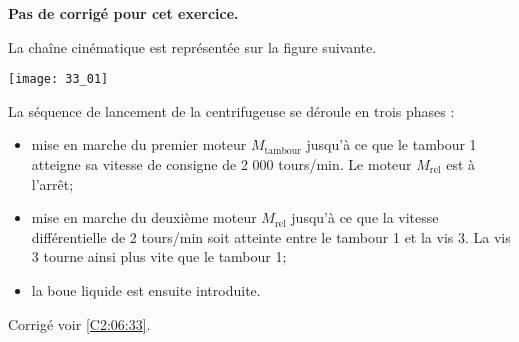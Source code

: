 \normaltrue \difficilefalse \tdifficilefalse
\correctiontrue


\setcounter{numques}{0}

\ifcorrection
\else
\textbf{Pas de corrigé pour cet exercice.}
\fi

\ifprof
\else

La chaîne cinématique est représentée sur la figure
suivante.
\begin{center}
\texttt{[image: 33\_01]}
\end{center}


La séquence de lancement de la centrifugeuse se déroule en trois phases :
\begin{itemize}
\item mise en marche du premier moteur $M_{\text{tambour}}$ jusqu’à ce que le tambour 1 atteigne sa vitesse
de consigne de 2 000 tours/min. Le moteur $M_{\text{rel}}$ est à l’arrêt;
\item mise en marche du deuxième moteur $M_{\text{rel}}$ jusqu’à ce que la vitesse différentielle de
2 tours/min soit atteinte entre le tambour 1 et la vis 3. La vis 3 tourne ainsi plus vite que le
tambour 1;
\item la boue liquide est ensuite introduite.
\end{itemize}
\fi


\ifprof
\else
\fi

\ifprof
\else
\begin{flushright}
\footnotesize{Corrigé  voir \ref{C2:06:33}.}
\end{flushright}%
\fi